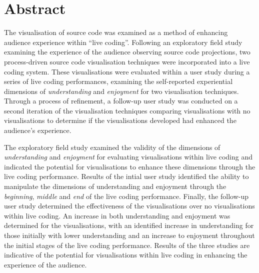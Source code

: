 
\chapter*{Abstract}
\label{chap:abstract}

The visualisation of source code was examined as a method of enhancing audience experience within ``live coding''. Following an exploratory field study examining the experience of the audience observing source code projections, two process-driven source code visualisation techniques were incorporated into a live coding system. These visualisations were evaluated within a user study during a series of live coding performances, examining the self-reported experiential dimensions of \emph{understanding} and \emph{enjoyment} for two visualisation techniques. Through a process of refinement, a follow-up user study was conducted on a second iteration of the visualisation techniques comparing visualisations with no visualisations to determine if the visualisations developed had enhanced the audience's experience.

The exploratory field study examined the validity of the dimensions of \emph{understanding} and \emph{enjoyment} for evaluating visualisations within live coding and indicated the potential for visualisations to enhance these dimensions through the live coding performance. Results of the intial user study identified the ability to manipulate the dimensions of understanding and enjoyment through the \emph{beginning}, \emph{middle} and \emph{end} of the live coding performance. Finally, the follow-up user study determined the effectiveness of the visualisations over no visualisations within live coding. An increase in both understanding and enjoyment was determined for the visualisations, with an identified increase in understanding for those initially with lower understanding and an increase to enjoyment throughout the initial stages of the live coding performance. Results of the three studies are indicative of the potential for visualisations within live coding in enhancing the experience of the audience. 

